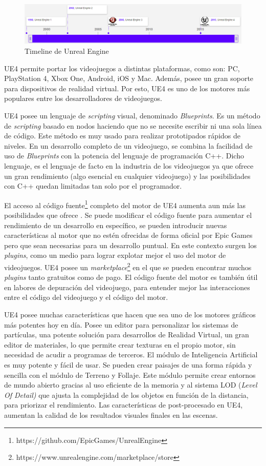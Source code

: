 \begin{figure}[h]
\centering
\includegraphics[width=15cm]{./images/timeline.png}
\caption{Timeline de Unreal Engine}
\end{figure}

UE4 permite portar los videojuegos a distintas plataformas, como son: PC, PlayStation 4, Xbox One, Android, iOS y Mac. Además, posee un gran soporte para dispositivos de realidad virtual. Por esto, UE4 es uno de los motores más populares entre los desarrolladores de videojuegos. 

UE4 posee un lenguaje de \textit{scripting} visual, denominado \textit{Blueprints}. Es un método de \textit{scripting} basado en nodos haciendo que no se necesite escribir ni una sola línea de código. Este método es muy usado para realizar prototipados rápidos de niveles. En un desarrollo completo de un videojuego, se combina la facilidad de uso de \textit{Blueprints} con la potencia del lenguaje de programación C++. Dicho lenguaje, es el lenguaje de facto en la industria de los videojuegos ya que ofrece un gran rendimiento (algo esencial en cualquier videojuego) y las posibilidades con C++ quedan limitadas tan solo por el programador.

El acceso al código fuente\footnote{https://github.com/EpicGames/UnrealEngine} completo del motor de UE4 aumenta aun más las posibilidades que ofrece \cite{6}. Se puede modificar el código fuente para aumentar el rendimiento de un desarrollo en específico, se pueden introducir nuevas características al motor que no estén ofrecidas de forma oficial por Epic Games pero que sean necesarias para un desarrollo puntual. En este contexto surgen los \textit{plugins}, como un medio para lograr explotar mejor el uso del motor de videojuegos. UE4 posee un \textit{marketplace}\footnote{https://www.unrealengine.com/marketplace/store} en el que se pueden encontrar muchos \textit{plugins} tanto gratuitos como de pago. El código fuente del motor es también útil en labores de depuración del videojuego, para entender mejor las interacciones entre el código del videojuego y el código del motor.

UE4 posee muchas características que hacen que sea uno de los motores gráficos más potentes hoy en día. Posee un editor para personalizar los sistemas de partículas, una potente solución para desarrollos de Realidad Virtual, un gran editor de materiales, lo que permite crear texturas en el propio motor, sin necesidad de acudir a programas de terceros. El módulo de Inteligencia Artificial es muy potente y fácil de usar. Se pueden crear paisajes de una forma rápida y sencilla con el módulo de Terreno y Follaje. Este módulo permite crear entornos de mundo abierto gracias al uso eficiente de la memoria y al sistema LOD (\textit{Level Of Detail)} que ajusta la complejidad de los objetos en función de la distancia, para priorizar el rendimiento. Las características de post-procesado en UE4, aumentan la calidad de los resultados visuales finales en las escenas.


